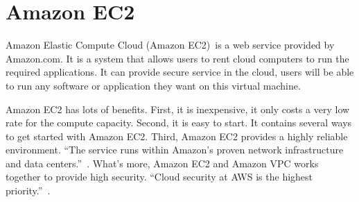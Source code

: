 \section{Amazon EC2}
Amazon Elastic Compute Cloud (Amazon EC2)~\cite{www-amazonec2}is 
a web service provided by Amazon.com. It is a system that allows
users to rent cloud computers to run the required applications.
It can provide secure service in the cloud, users will be able
to run any software or application they want on this virtual machine.

Amazon EC2 has lots of benefits. First, it is inexpensive, it only 
costs a very low rate for the compute capacity. Second, it is easy to
start. It contains several ways to get started with Amazon EC2. Third,
Amazon EC2 provides a highly reliable environment. ``The service runs 
within Amazon’s proven network infrastructure and data centers.''~\cite{www-amazonec2}.
What's more, Amazon EC2 and Amazon VPC works together to provide high
security. ``Cloud security at AWS is the highest priority.''~\cite{www-amazonec2}.

